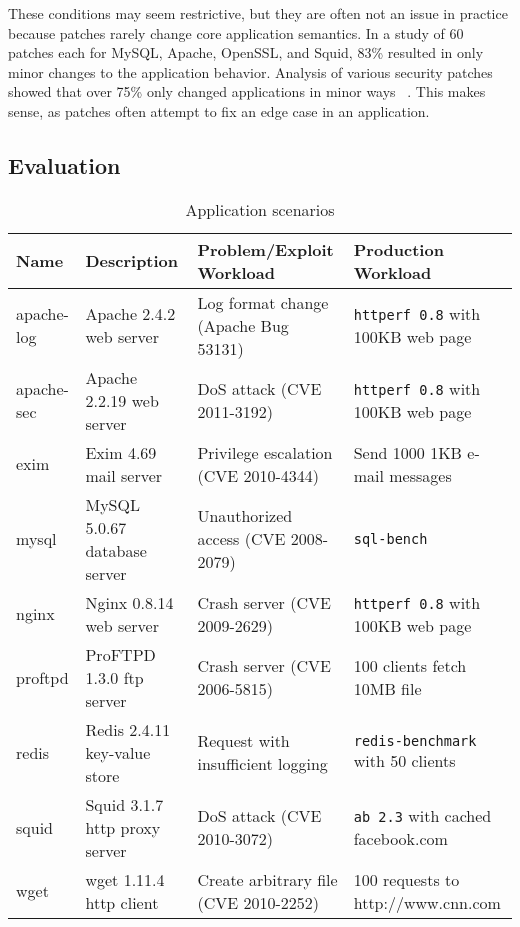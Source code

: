 These conditions may seem restrictive, but they are often not an issue in
practice because patches rarely change core
application semantics. In a study of 60 patches each for MySQL, Apache, OpenSSL,
and Squid, 83\% resulted in only minor changes to the application behavior.
Analysis of various security patches showed that over 75\% only
changed applications in minor ways ~\cite{mreplay-feas}. This makes sense, as
patches often attempt to fix an edge case in an application.
\subsection{Evaluation}
\label{sec:results}

\begin{table*}[t]
\begin{center}
\small
\begin{tabular}{|l|l|l|l|}   \hline
{\bf Name} & {\bf Description} & {\bf Problem/Exploit Workload} & {\bf
  Production Workload} \\
\hline\hline 
		apache-log &
		Apache 2.4.2 web server &
		Log format change (Apache Bug 53131) &
		{\tt httperf 0.8} with 100KB web page\\
\hline
		apache-sec &
		Apache 2.2.19 web server &
		DoS attack (CVE 2011-3192) &
                {\tt httperf 0.8} with 100KB web page\\
\hline
		exim &
		Exim 4.69 mail server &
		Privilege escalation (CVE 2010-4344) &
		Send 1000 1KB e-mail messages \\
\hline
		mysql &
		MySQL 5.0.67 database server &
		Unauthorized access (CVE 2008-2079) &
		{\tt sql-bench} \\
\hline
		nginx &
		Nginx 0.8.14 web server &
		Crash server (CVE 2009-2629) &
		{\tt httperf 0.8} with 100KB web page\\
\hline
		proftpd &
		ProFTPD 1.3.0 ftp server &
		Crash server (CVE 2006-5815) &
		100 clients fetch 10MB file \\
\hline
		redis &
		Redis 2.4.11 key-value store &
		Request with insufficient logging &
		{\tt redis-benchmark} with 50 clients\\
\hline
		squid &
		Squid 3.1.7 http proxy server &
		DoS attack (CVE 2010-3072) &
		{\tt ab 2.3} with cached facebook.com \\
\hline
		wget &
		wget 1.11.4 http client &
		Create arbitrary file (CVE 2010-2252) &
		100 requests to http://www.cnn.com \\
\hline
\end{tabular}
\end{center}
\renewcommand\thetable{2}
\caption{Application scenarios}
\label{tab:scenarios}
\end{table*}

